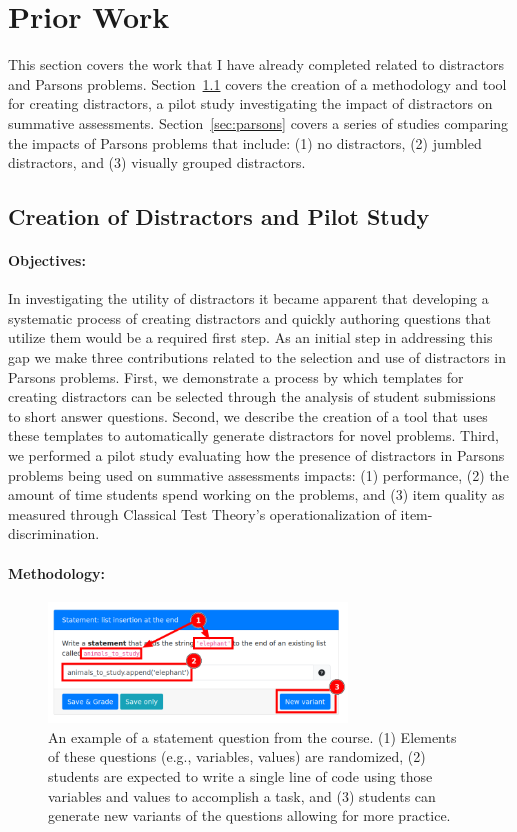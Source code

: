 \documentclass[authorversion,nonacm]{acmart}
\begin{document}
\section{Prior Work}

This section covers the work that I have already completed related to
distractors and Parsons problems. Section~\ref{sec:creation} covers the
creation of a methodology and tool for creating distractors, a pilot study
investigating the impact of distractors on summative assessments.
Section~\ref{sec:parsons} covers a series of studies comparing the impacts of
Parsons problems that include: (1) no distractors, (2) jumbled distractors, and
(3) visually grouped distractors.

\subsection{Creation of Distractors and Pilot Study}\label{sec:creation}

\paragraph{Objectives:} In investigating the utility of distractors it became 
apparent that developing a systematic process of creating distractors and 
quickly authoring questions that utilize them would be a required first step.
As an initial step in addressing this gap we make three contributions related to
the selection and use of distractors in Parsons problems. First, we demonstrate
a process by which templates for creating distractors can be selected through
the analysis of student submissions to short answer questions. Second, we
describe the creation of a tool that uses these templates to automatically
generate distractors for novel problems. Third, we performed a pilot study
evaluating how the presence of distractors in Parsons problems being used on
summative assessments impacts: (1) performance, (2) the amount of time students
spend working on the problems, and (3) item quality as measured through
Classical Test Theory's operationalization of item-discrimination.

\paragraph{Methodology:}

\begin{figure}
  \centering
  \includegraphics[width=300px]{imgs/pl-question.png}
  \caption{
    An example of a statement question from the course. (1) Elements of these
    questions (e.g., variables, values) are randomized, (2) students are
    expected to write a single line of code using those variables and values to
    accomplish a task, and (3) students can generate new variants of the
    questions allowing for more practice.
  } 
  \label{fig:append-stmnt}
\end{figure}
\end{document}
